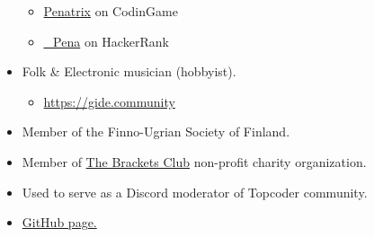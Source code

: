 \documentclass[margin, 10pt]{res} %
\begin{document}
\begin{resume}
\begin{itemize}
\begin{itemize}
	\item \href{https://www.codingame.com/profile/e3a213a1df3e0d739af5ddb7dbfe73a07564915}{Penatrix} on CodinGame
	\item \href{https://www.hackerrank.com/_Pena}{\_Pena} on HackerRank
\end{itemize}
\item Folk \& Electronic musician (hobbyist).
\begin{itemize}
	\item \href{https://gide.community}{https://gide.community}
\end{itemize}
\item Member of the Finno-Ugrian Society of Finland.
\item Member of \href{https://thebracketsclub.com/}{The Brackets Club} non-profit charity organization.
\item Used to serve as a Discord moderator of Topcoder community.
\item \href{https://github.com/gingerdeer}{GitHub page.}
\end{itemize}



\end{resume}
\end{document}
